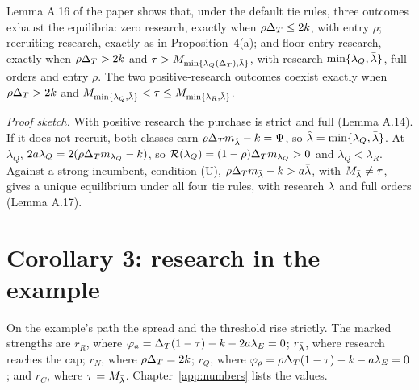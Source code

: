 Lemma A.16 of the paper shows that, under the default tie rules, three outcomes exhaust the equilibria: zero research,
exactly when \(\rho\Delta_T\le2k\), with entry \(\rho\); recruiting research, exactly as in Proposition~4(a); and
floor-entry research, exactly when \(\rho\Delta_T>2k\) and \(\tau>M_{\min\{\lambda_Q(\Delta_T),\bar\lambda\}}\), with research
\(\min\{\lambda_Q,\bar\lambda\}\), full orders and entry \(\rho\). The two positive-research outcomes coexist exactly when
\(\rho\Delta_T>2k\) and \(M_{\min\{\lambda_Q,\bar\lambda\}}<\tau\le M_{\min\{\lambda_R,\bar\lambda\}}\).

\emph{Proof sketch.} With positive research the purchase
is strict and full (Lemma A.14). If it does not recruit, both classes earn \(\rho\Delta_T m_{\hat\lambda}-k=\Psi\), so
\(\hat\lambda=\min\{\lambda_Q,\bar\lambda\}\). At \(\lambda_Q\), \(2a\lambda_Q=2(\rho\Delta_T m_{\lambda_Q}-k)\), so
\(\mathcal R(\lambda_Q)=(1-\rho)\Delta_T m_{\lambda_Q}>0\) and \(\lambda_Q<\lambda_R\). Against a strong incumbent, condition
(U), \(\rho\Delta_T m_{\bar\lambda}-k>a\bar\lambda\), with \(M_{\bar\lambda}\ne\tau\), gives a unique equilibrium under all four tie rules, with
research \(\bar\lambda\) and full orders (Lemma A.17).

\section{Corollary 3: research in the example}\label{sec:research-example}

On the example's path the spread and the threshold rise strictly. The marked strengths are \(r_R\), where
\(\varphi_a=\Delta_T(1-\tau)-k-2a\lambda_E=0\); \(r_{\bar\lambda}\), where research reaches the cap; \(r_N\), where \(\rho\Delta_T=2k\);
\(r_Q\), where \(\varphi_\rho=\rho\Delta_T(1-\tau)-k-a\lambda_E=0\); and \(r_C\), where \(\tau=M_{\bar\lambda}\). Chapter~\ref{app:numbers}
lists the values.


